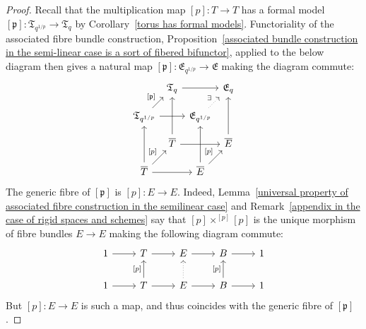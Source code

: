 \documentclass[10pt,oneside]{amsart}
\theoremstyle{definition}
\begin{document}
	\begin{proof}
		Recall that the multiplication map $[p]:T\rightarrow T$ has a formal model $[\mathfrak p]:\mathfrak T_{q^{1/p}}\rightarrow \mathfrak T_q$ by Corollary~\ref{torus has formal models}. 
		Functoriality of the associated fibre bundle construction, Proposition~\ref{associated bundle construction in the semi-linear case is a sort of fibered bifunctor}, applied to the below diagram then gives a natural map $[\mathfrak p]:\mathfrak E_{q^{1/p}}\rightarrow \mathfrak E$ making the diagram commute:
			\begin{equation}\label{formal model of p-multiplication cube}
			\begin{tikzcd}[column sep={1cm,between origins},row sep={1cm,between origins}]
				& \mathfrak T_{q} \arrow[rr] &  & \mathfrak E_q \\
				\mathfrak T_{q^{1/p}} \arrow[ru, "{[\mathfrak p]}"] \arrow[rr] &  & \mathfrak E_{q^{1/p}} \arrow[ru, "\exists", dotted] &  \\
				& \overline{T} \arrow[uu] \arrow[rr] &  & \overline{E} \arrow[uu] \\
				\overline{T} \arrow[uu] \arrow[rr] \arrow[ru, "{[p]}"] &  & \overline{E} \arrow[uu] \arrow[ru, "{[p]}"] & 
			\end{tikzcd}
			\end{equation}
		The generic fibre of $[\mathfrak p]$ is $[p]:E\to E$. 
		Indeed, Lemma~\ref{universal property of associated fibre construction in the semilinear case} and Remark~\ref{appendix in the case of rigid spaces and schemes} say that $[p]\times^{[p]}[p]$ is the unique morphism of fibre bundles $E\rightarrow E$ making the following diagram commute:
		\begin{equation}\label{rigid p-multiplication cube}
		\begin{tikzcd}
		1 \arrow[r] & T \arrow[r]                    & E \arrow[r]                   & B \arrow[r]                    & 1 \\
		1 \arrow[r] & T \arrow[u, "{[p]}"] \arrow[r] & E \arrow[u, dotted] \arrow[r] & B \arrow[u, "{[p]}"] \arrow[r] & 1
		\end{tikzcd}
		\end{equation}
		But $[p]:E\rightarrow E$ is such a map, and thus coincides with the generic fibre of $[\mathfrak p]$.
	

\end{proof}
\end{document}
